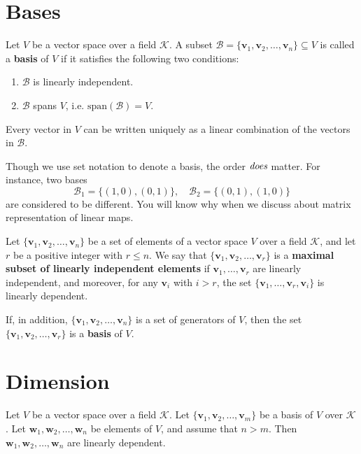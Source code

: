 \section{Bases}
\begin{definitionenv}
	Let $V$ be a vector space over a field $\mathcal{K}$.
	A subset $\mathcal{B} = \{\bm{v}_1, \bm{v}_2, \dots, \bm{v}_n\} \subseteq V$ is called a \textbf{basis} of $V$ if it satisfies the following two conditions:
	\begin{enumerate}
		\item $\mathcal{B}$ is linearly independent.
		\item $\mathcal{B}$ spans $V$, i.e. $\mathrm{span}(\mathcal{B}) = V$.
	\end{enumerate}
\end{definitionenv}
\begin{theoremenv}
	 Every vector in $V$ can be written uniquely as a linear combination of the vectors in $\mathcal{B}$.
\end{theoremenv}

\begin{remarkenv}
	Though we use set notation to denote a basis, the order $\emph{does}$ matter. For instance, two bases
	\[
	\mathcal{B}_1=\{(1,0),(0,1)\},\quad \mathcal{B}_2=\{(0,1),(1,0)\}
	\]
	are considered to be different. You will know why when we discuss about matrix representation of linear maps.
\end{remarkenv}

\begin{theoremenv}
	Let $\{\bm{v}_1, \bm{v}_2, \dots, \bm{v}_n\}$ be a set of elements of a vector space $V$ over a field $\mathcal{K}$, and let $r$ be a positive integer with $r \leq n$.
	We say that $\{\bm{v}_1, \bm{v}_2, \dots, \bm{v}_r\}$ is a \textbf{maximal subset of linearly independent elements} if
	$\bm{v}_1, \dots, \bm{v}_r$ are linearly independent, and moreover, for any $\bm{v}_i$ with $i > r$, the set
	$\{\bm{v}_1, \dots, \bm{v}_r, \bm{v}_i\}$ is linearly dependent.

	If, in addition, $\{\bm{v}_1, \bm{v}_2, \dots, \bm{v}_n\}$ is a set of generators of $V$,
	then the set $\{\bm{v}_1, \bm{v}_2, \dots, \bm{v}_r\}$ is a \textbf{basis} of $V$.
\end{theoremenv}


\section{Dimension}

\begin{theoremenv}
	Let $V$ be a vector space over a field $\mathcal{K}$.
	Let $\{\bm{v}_1, \bm{v}_2, \dots, \bm{v}_m\}$ be a basis of $V$ over $\mathcal{K}$.
	Let $\bm{w}_1, \bm{w}_2, \dots, \bm{w}_n$ be elements of $V$, and assume that $n > m$.
	Then $\bm{w}_1, \bm{w}_2, \dots, \bm{w}_n$ are linearly dependent.
\end{theoremenv}

